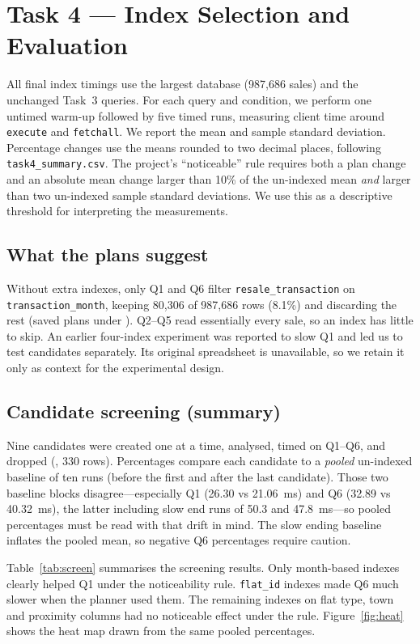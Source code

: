 \section{Task 4 --- Index Selection and Evaluation}

All final index timings use the largest database (987{,}686 sales) and the unchanged Task~3 queries.
For each query and condition, we perform one untimed warm-up followed by five timed runs, measuring client time around \texttt{execute} and \texttt{fetchall}. We report the mean and sample standard deviation. Percentage changes use the means rounded to two decimal places, following \texttt{task4\_summary.csv}.
The project's ``noticeable'' rule requires both a plan change and an absolute mean change larger than 10\% of the un-indexed mean \emph{and} larger than two un-indexed sample standard deviations.
We use this as a descriptive threshold for interpreting the measurements.

\subsection{What the plans suggest}
Without extra indexes, only Q1 and Q6 filter \texttt{resale\_transaction} on \texttt{transaction\_month}, keeping 80{,}306 of 987{,}686 rows (8.1\%) and discarding the rest (saved plans under ).
Q2--Q5 read essentially every sale, so an index has little to skip.
An earlier four-index experiment was reported to slow Q1 and led us to test candidates separately. Its original spreadsheet is unavailable, so we retain it only as context for the experimental design.

\subsection{Candidate screening (summary)}
Nine candidates were created one at a time, analysed, timed on Q1--Q6, and dropped
(, 330 rows).
Percentages compare each candidate to a \emph{pooled} un-indexed baseline of ten runs (before the first and after the last candidate).
Those two baseline blocks disagree---especially Q1 (26.30 vs 21.06~ms) and Q6 (32.89 vs 40.32~ms), the latter including slow end runs of 50.3 and 47.8~ms---so pooled percentages must be read with that drift in mind.
The slow ending baseline inflates the pooled mean, so negative Q6 percentages require caution.

Table~\ref{tab:screen} summarises the screening results.
Only month-based indexes clearly helped Q1 under the noticeability rule.
\texttt{flat\_id} indexes made Q6 much slower when the planner used them.
The remaining indexes on flat type, town and proximity columns had no noticeable effect under the rule.
Figure~\ref{fig:heat} shows the heat map drawn from the same pooled percentages.


